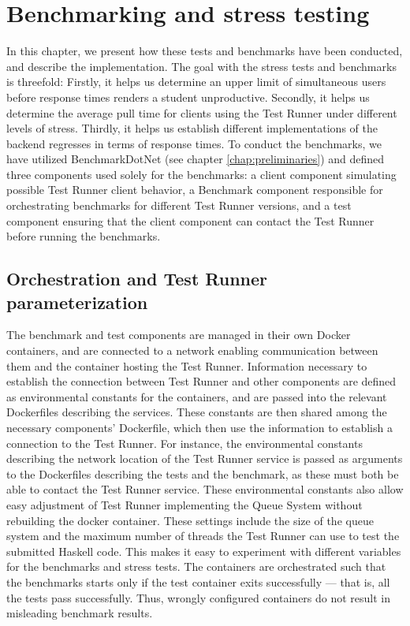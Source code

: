 \section{Benchmarking and stress testing} \label{chap:Benchmarking}
In this chapter, we present how these tests and benchmarks have been conducted, and describe the implementation. 
The goal with the stress tests and benchmarks is threefold: 
Firstly, it helps us determine an upper limit of simultaneous users before response times renders a student unproductive.
Secondly, it helps us determine the average pull time for clients using the Test Runner under different levels of stress.
Thirdly, it helps us establish different implementations of the backend regresses in terms of response times.
To conduct the benchmarks, we have utilized BenchmarkDotNet (see chapter \ref{chap:preliminaries}) and defined three components used solely for the benchmarks:
a client component simulating possible Test Runner client behavior, a Benchmark component responsible for orchestrating benchmarks for different Test Runner versions, and a test component ensuring that the client component can contact the Test Runner before running the benchmarks.

\subsection{Orchestration and Test Runner parameterization}
The benchmark and test components are managed in their own Docker containers, and are connected to a network enabling communication between them and the container hosting the Test Runner. 
Information necessary to establish the connection between Test Runner and other components are defined as environmental constants for the containers, and are passed into the relevant Dockerfiles describing the services.
These constants are then shared among the necessary components' Dockerfile, which then use the information to establish a connection to the Test Runner.
For instance, the environmental constants describing the network location of the Test Runner service is passed as arguments to the Dockerfiles describing the tests and the benchmark, as these must both be able to contact the Test Runner service.
These environmental constants also allow easy adjustment of Test Runner implementing the Queue System without rebuilding the docker container.
These settings include the size of the queue system and the maximum number of threads the Test Runner can use to test the submitted Haskell code.
This makes it easy to experiment with different variables for the benchmarks and stress tests.  
The containers are orchestrated such that the benchmarks starts only if the test container exits successfully --- that is, all the tests pass successfully. 
Thus, wrongly configured containers do not result in misleading benchmark results.

